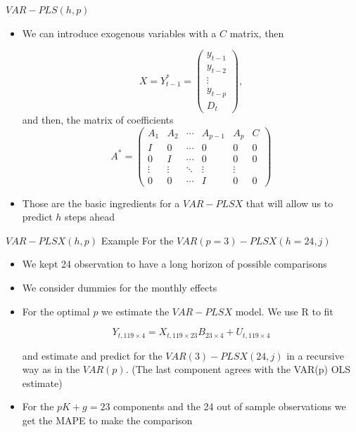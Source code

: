 \documentclass{beamer}
\newcommand{\?}{?`}
\begin{document}
\begin{frame}{$VAR-PLS(h,p)$}
  \begin{itemize}
  \item We can introduce exogenous variables with a $C$ matrix, then
      \begin{footnotesize}
    \begin{displaymath}
      X=Y_{t-1}^{*}=\left(
        \begin{array}{c}
          y_{t-1} \\
          y_{t-2} \\
          \vdots \\
          y_{t-p} \\
          D_t
        \end{array}
      \right),
    \end{displaymath}
    and then, the matrix of coefficients
    \begin{displaymath}
      A^{*}=\left(
        \begin{array}{cccccc}
          A_1 & A_2 & \cdots & A_{p-1} & A_p & C \\
          I & 0 & \cdots & 0 & 0 & 0 \\
          0 & I & \cdots & 0 & 0 & 0 \\
          \vdots & \vdots & \ddots & \vdots & \vdots \\
          0 & 0 & \cdots & I & 0 & 0
        \end{array}
        \right)
    \end{displaymath}
    \end{footnotesize}
  \item Those are the basic ingredients for a  $VAR-PLSX$ that will allow us to predict $h$ steps ahead
  \end{itemize}
\end{frame}

\begin{frame}{$VAR-PLSX(h,p)$ Example}
 For the $VAR(p=3)-PLSX(h=24,j)$
  \begin{itemize}
  \item We kept 24 observation to have a long horizon of possible comparisons
  \item We consider dummies for the monthly effects
  \item For the optimal $p$ we estimate the $VAR-PLSX$ model.  We use R to fit

  $$Y_{t,119\times 4} = X_{t,119\times 23} B_{23\times 4}+ U_{t,119\times 4}$$

and estimate and predict for the $VAR(3)-PLSX(24,j)$ in a recursive way as in the $VAR(p)$. (The last component agrees with the VAR(p) OLS estimate)
  \item For the $pK+g=23$ components and the 24 out of
  sample observations we get the MAPE to make the comparison
  \end{itemize}
\end{frame}
\end{document}
